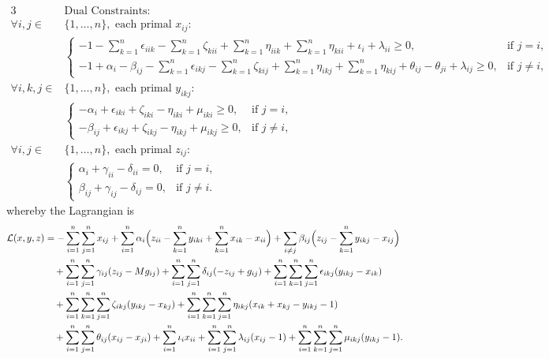 \begin{alignat}{3}
& \text{Dual Constraints: } \nonumber \\
\forall i,j \in & \{1,\dots,n\}, \text{ each primal } x_{ij}: \nonumber \\
& \begin{cases}
\displaystyle -1 - \sum_{k=1}^n \epsilon_{iik} - \sum_{k=1}^n \zeta_{kii} + \sum_{k=1}^n \eta_{iik} + \sum_{k=1}^n \eta_{kii} + \iota_i + \lambda_{ii} \ge 0, & \text{if } j=i, \\
\displaystyle -1 + \alpha_i - \beta_{ij} - \sum_{k=1}^n \epsilon_{ikj} - \sum_{k=1}^n \zeta_{kij} + \sum_{k=1}^n \eta_{ikj} + \sum_{k=1}^n \eta_{kij} + \theta_{ij} - \theta_{ji} + \lambda_{ij} \ge 0, & \text{if } j \neq i,
\end{cases} \label{eq:dual_x_constraints} \\
\forall i,k,j \in & \{1,\dots,n\}, \text{ each primal } y_{ikj}: \nonumber \\
& \begin{cases}
\displaystyle - \alpha_i + \epsilon_{iki} + \zeta_{iki} - \eta_{iki} + \mu_{iki} \ge 0, & \text{if } j=i, \\
\displaystyle - \beta_{ij} + \epsilon_{ikj} + \zeta_{ikj} - \eta_{ikj} + \mu_{ikj} \ge 0, & \text{if } j\neq i,
\end{cases} \label{eq:dual_y_constraints} \\
\forall i,j \in & \{1,\dots,n\}, \text{ each primal } z_{ij}: \nonumber \\
& \begin{cases}
\displaystyle \alpha_i + \gamma_{ii} - \delta_{ii} = 0, & \text{if } j=i, \\
\displaystyle \beta_{ij} + \gamma_{ij} - \delta_{ij} = 0, & \text{if } j\neq i .
\end{cases} \label{eq:dual_z_constraints}
\end{alignat}
whereby the Lagrangian is 
\[
\begin{aligned}
\mathcal{L}(x,y,z) &= - \sum_{i=1}^n \sum_{j=1}^n x_{ij} + \sum_{i=1}^n \alpha_i \Bigl(z_{ii} - \sum_{k=1}^n y_{iki} + \sum_{k=1}^n x_{ik} - x_{ii}\Bigr) + \sum_{i \neq j} \beta_{ij} \Bigl(z_{ij} - \sum_{k=1}^n y_{ikj} - x_{ij}\Bigr) \\
& \quad + \sum_{i=1}^n \sum_{j=1}^n \gamma_{ij}(z_{ij}-Mg_{ij})  + \sum_{i=1}^n \sum_{j=1}^n \delta_{ij}(-z_{ij}+g_{ij}) + \sum_{i=1}^n \sum_{k=1}^n \sum_{j=1}^n \epsilon_{ikj}(y_{ikj}-x_{ik}) \\
& \quad + \sum_{i=1}^n \sum_{k=1}^n \sum_{j=1}^n \zeta_{ikj}(y_{ikj}-x_{kj}) + \sum_{i=1}^n \sum_{k=1}^n \sum_{j=1}^n \eta_{ikj}(x_{ik}+x_{kj}-y_{ikj}-1) \\
& \quad + \sum_{i=1}^n \sum_{j=1}^n \theta_{ij}(x_{ij} - x_{ji}) + \sum_{i=1}^n \iota_{i}x_{ii} + \sum_{i=1}^n \sum_{j=1}^n \lambda_{ij}(x_{ij}-1) + \sum_{i=1}^n \sum_{k=1}^n \sum_{j=1}^n \mu_{ikj}(y_{ikj}-1).
\end{aligned}
\]
